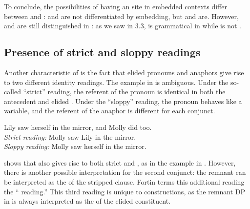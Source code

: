 \documentclass[output=paper]{LSP/langsci}
\begin{document}
{{
 
\z
\z

To conclude, the possibilities of having an  site in embedded contexts differ between  and :  and  are not differentiated by embedding, but  and  are. However,  and  are still distinguished in  : as we saw in 3.3,  is grammatical in    while  is not .

\subsection{Presence of strict and sloppy readings}\label{sec:johnson:3.5}

Another characteristic of  is the fact that elided pronouns and anaphors give rise to two different identity readings. The  example in  is ambiguous. Under the so-called ``strict'' reading, the referent of the pronoun is identical in both the antecedent and elided . Under the ``sloppy'' reading, the pronoun behaves like a variable, and the referent of the anaphor is different for each conjunct.
  
\ea\label{ex:johnson:42} 
Lily saw herself in the mirror, and Molly did too.\\
\textit{Strict reading:} Molly saw Lily in the mirror.\\
\textit{Sloppy reading:} Molly saw herself in the mirror.
\z

\citet{Fortin2007} shows that  also gives rise to both strict and , as in the example in . However, there is another possible interpretation for the second conjunct: the remnant can be interpreted as the  of the stripped clause. Fortin terms this additional reading the `` reading.'' This third reading is unique to  constructions, as the remnant DP in  is always interpreted as the  of the elided constituent. 
  
}}
\end{document}
